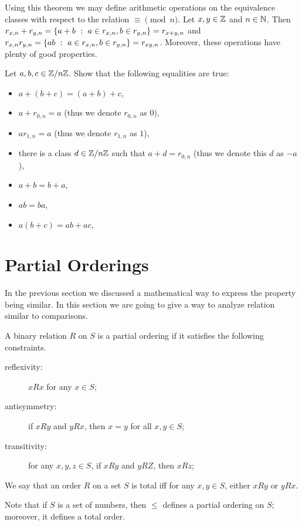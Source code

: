 Using this theorem we may define arithmetic operations on the equivalence
classes with respect to the relation $\equiv \pmod{n}$.
Let $x, y \in \mathbb{Z}$ and $n \in \mathbb{N}$. Then
$r_{x, n} + r_{y, n} = \set[a \in r_{x, n}, b \in r_{y, n}]{a + b} =
r_{x + y, n}$ and
$r_{x, n} r_{y, n} = \set[a \in r_{x, n}, b \in r_{y, n}]{ab} = r_{xy, n}$.
Moreover, these operations have plenty of good properties.
\begin{exercise}
  Let $a, b, c \in \mathbb{Z} / n\mathbb{Z}$.
  Show that the following equalities are true:
  \begin{itemize}
    \item $a + (b + c) = (a + b) + c$,
    \item $a + r_{0, n} = a$ (thus we denote $r_{0, n}$ as $0$),
    \item $a r_{1, n} = a$ (thus we denote $r_{1, n}$ as $1$),
    \item there is a class $d \in \mathbb{Z} / n\mathbb{Z}$ such that $a + d = r_{0, n}$
      (thus we denote this $d$ as $-a$),
    \item $a + b = b + a$,
    \item $ab = ba$,
    \item $a(b + c) = ab + ac$,
  \end{itemize}
\end{exercise}

\section{Partial Orderings}
In the previous section we discussed a mathematical way to express
the property being similar. In this section we are going to give a way to
analyze relation similar to comparisons.

\begin{definition}
  A binary relation $R$ on $S$ is a partial ordering if it satisfies the
  following
 constraints.
  \begin{description}
    \item[reflexivity:]  $x R x$ for any $x \in S$;
    \item[antisymmetry:] if $x R y$ and $y R x$, then $x = y$ for all $x, y \in
      S$;
    \item[transitivity:] for any $x, y, z \in S$, if $x R y$ and $y R Z$, then
      $x R z$;
  \end{description}

  We say that an order $R$ on a set $S$ is total iff for any $x, y \in S$,
  either $x R y$ or $y R x$.
\end{definition}
\noindent Note that if $S$ is a set of numbers, then $\le$ defines a partial
ordering on $S$; moreover, it defines a total order.

